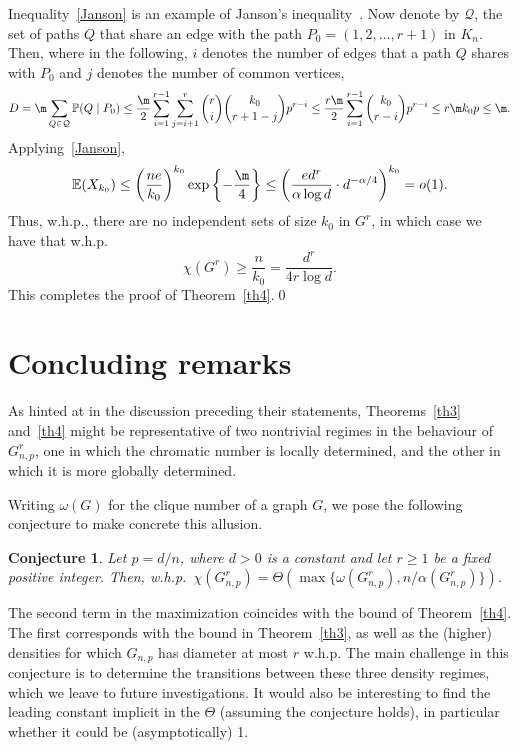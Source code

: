 \documentclass[12pt,a4paper]{article}
\def\a{\alpha} \def\b{\beta} \def\d{\delta} \def\D{\Delta}
\def\cQ{{\cal Q}}
\newtheorem{conjecture}[theorem]{Conjecture}
\newcommand{\brac}[1]{\left(#1\right)}
\newcommand{\bfrac}[2]{\left(\frac{#1}{#2}\right)}
\newcommand{\set}[1]{\left\{#1\right\}}
\def\E{\mathbb{E}}
\def\Pr{\mathbb{P}}
\def\cQ{{\mathcal Q}}
\theoremstyle{plain}
\begin{document}
Inequality~\eqref{Janson} is an example of Janson's inequality~\cite{Jan90}. Now denote by $\cQ$, the set of paths $Q$ that share an edge with the path $P_0=(1,2,\ldots,r+1)$ in $K_n$. Then, where in the following, $i$ denotes the number of edges that a path $Q$ shares with $P_0$ and $j$ denotes the number of common vertices, 
\[
D=\m\sum_{Q\in \cQ}\Pr(Q\mid P_0)\leq \frac{\m}2\sum_{i=1}^{r-1}\sum_{j=i+1}^{r}\binom{r}{i}\binom{k_0}{r+1-j}p^{r-i}\leq \frac{r\m}2\sum_{i=1}^{r-1}\binom{k_0}{r-i}p^{r-i}\leq r\m k_0p\leq \m.
\]
Applying~\eqref{Janson},
\[
\E(X_{k_0})\leq \bfrac{ne}{k_0}^{k_0}\exp\set{-\frac{\m}{4}}\leq \brac{\frac{ed^r}{\a\log d}\cdot d^{-\a/4}}^{k_0}=o(1).
\]
Thus, w.h.p., there are no independent sets of size $k_0$ in $G^r$, in which case we have that w.h.p.
\[
\chi(G^r)\geq \frac{n}{k_0}=\frac{d^r}{4r\log d}.
\]
This completes the proof of Theorem~\ref{th4}.\hfill\qed
\section{Concluding remarks}
As hinted at in the discussion preceding their statements, Theorems~\ref{th3} and~\ref{th4} might be representative of two nontrivial regimes in the behaviour of $G_{n,p}^r$, one in which the chromatic number is locally determined, and the other in which it is more globally determined.

Writing $\omega(G)$ for the clique number of a graph $G$, we pose the following conjecture to make concrete this allusion.

\begin{conjecture}\label{conj:main}
Let $p=d/n$, where $d>0$ is a constant and let $r\geq 1$ be a fixed positive integer.  Then, w.h.p.~$\chi(G_{n,p}^r) = \Theta(\max\{\omega(G_{n,p}^r),n/\alpha(G_{n,p}^r)\})$.
\end{conjecture}

\noindent
The second term in the maximization coincides with the bound of Theorem~\ref{th4}. The first corresponds with the bound in Theorem~\ref{th3}, as well as the (higher) densities for which $G_{n,p}$ has diameter at most $r$ w.h.p. The main challenge in this conjecture is to determine the transitions between these three density regimes, which we leave to future investigations. It would also be interesting to find the leading constant implicit in the $\Theta$ (assuming the conjecture holds), in particular whether it could be (asymptotically) 1.
\end{document}
